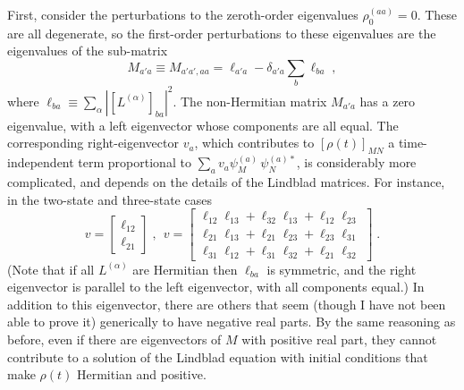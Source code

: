 First, consider the perturbations to the zeroth-order eigenvalues $\rho_0^{(aa)}=0$.  These are all degenerate, so the first-order perturbations to these eigenvalues are the eigenvalues of the sub-matrix
\begin{equation}
M_{a'a}\equiv M_{a'a',aa}=\ell_{a'a}-\delta_{a'a}\sum_b\ell_{ba}\;,
\end{equation}
where $\ell_{ba}\equiv \sum_\alpha|[L^{(\alpha)}]_{ba}|^2$.  The non-Hermitian matrix $M_{a'a}$ has a zero eigenvalue, with a left eigenvector whose components are all equal.  The corresponding right-eigenvector $v_a$, which contributes to $[\rho(t)]_{MN}$  a time-independent term proportional to $\sum_a v_a \psi^{(a)}_M\,\psi^{(a)*}_N$, is considerably more complicated, and depends on the details of the Lindblad matrices.  For instance, in the two-state and three-state cases
$$ v=\left[\begin{array}{c}\ell_{12}\\ \ell_{21}\end{array}\right]\;,~~
v=\left[\begin{array}{c}\ell_{12}\ell_{13}+\ell_{32}\ell_{13}+\ell_{12}\ell_{23}\\
\ell_{21}\ell_{13}+\ell_{21}\ell_{23}+\ell_{23}\ell_{31}\\  \ell_{31}\ell_{12}+\ell_{31}\ell_{32}+\ell_{21}\ell_{32}\end{array}\right]\;.$$
(Note that if all $L^{(\alpha)}$ are Hermitian then $\ell_{ba}$ is symmetric, and the right eigenvector is parallel to the left eigenvector, with all components equal.)  
In addition to this eigenvector, there are others that seem (though I have not been able to prove it) generically to have negative real parts.  By the same reasoning as before, even if there are eigenvectors of $M$ with positive real part, they cannot contribute to a solution of the Lindblad equation with initial conditions that make $\rho(t)$ Hermitian and positive.



